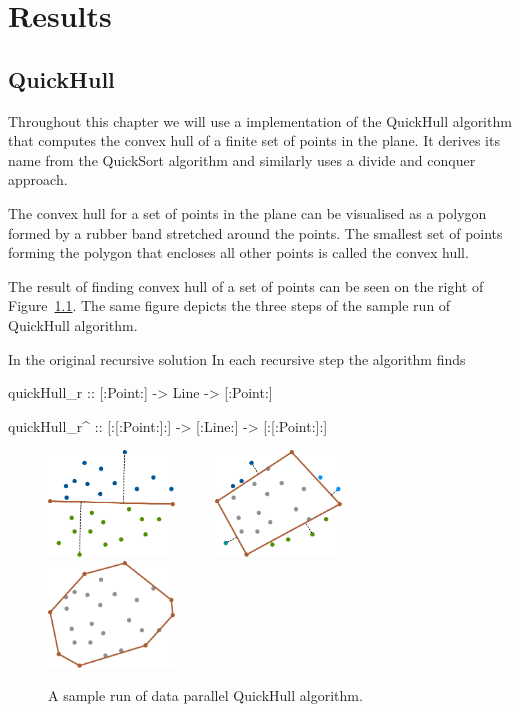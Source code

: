 \documentclass[preamble.tex]{subfiles}
\begin{document}
\clearpage

\chapter{Results}
\label{ch:results}


\section{QuickHull}
\label{sec:quickhull}

Throughout this chapter we will use a  implementation of the QuickHull algorithm that computes the convex hull of a finite set of points in the plane. It derives its name from the QuickSort algorithm and similarly uses a divide and conquer approach.

The convex hull for a set of points in the plane can be visualised as a polygon formed by a rubber band stretched around the points. The smallest set of points forming the polygon that encloses all other points is called the convex hull.

The result of finding convex hull of a set of points can be seen on the right of Figure~\ref{fig:qh-result}. The same figure depicts the three steps of the sample run of QuickHull algorithm.

In the original recursive solution In each recursive step the algorithm finds

\begin{hscode}
quickHull_r :: [:Point:] -> Line -> [:Point:]

quickHull_r^ :: [:[:Point:]:] -> [:Line:] -> [:[:Point:]:]
\end{hscode}


\begin{figure}
\includegraphics[width=0.3\textwidth]{img/Example-QuickHull-step1}~~~~~%
\includegraphics[width=0.3\textwidth]{img/Example-QuickHull-step2}~~~~~%
\includegraphics[width=0.3\textwidth]{img/Example-QuickHull-step3}%
\caption{A sample run of data parallel QuickHull algorithm.}
\label{fig:qh-result}
\end{figure}
\end{document}
